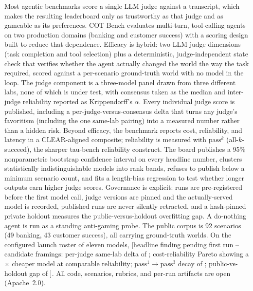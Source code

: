 Most agentic benchmarks score a single LLM judge against a transcript, which makes
the resulting leaderboard only as trustworthy as that judge and as gameable as its
preferences. COT Bench evaluates multi-turn, tool-calling agents on two production
domains (banking and customer success) with a scoring design built to reduce that
dependence. Efficacy is hybrid: two LLM-judge dimensions (task completion and tool
selection) plus a deterministic, judge-independent state check that verifies
whether the agent actually changed the world the way the task required, scored
against a per-scenario ground-truth world with no model in the loop. The judge
component is a three-model panel drawn from three different labs, none of which is
under test, with consensus taken as the median and inter-judge reliability reported
as Krippendorff's $\alpha$. Every individual judge score is published, including a
per-judge-versus-consensus delta that turns any judge's favoritism (including the
one same-lab pairing) into a measured number rather than a hidden risk. Beyond
efficacy, the benchmark reports cost, reliability, and latency in a CLEAR-aligned
composite; reliability is measured with $\text{pass}^k$ (all-$k$-succeed), the
sharper tau-bench reliability construct. The board publishes a 95\% nonparametric
bootstrap confidence interval on every headline number, clusters statistically
indistinguishable models into rank bands, refuses to publish below a minimum
scenario count, and fits a length-bias regression to test whether longer outputs
earn higher judge scores. Governance is explicit: runs are pre-registered before
the first model call, judge versions are pinned and the actually-served model is
recorded, published runs are never silently retracted, and a hash-pinned private
holdout measures the public-versus-holdout overfitting gap. A do-nothing agent is
run as a standing anti-gaming probe. The public corpus is 92 scenarios
(49 banking, 43 customer success), all carrying ground-truth worlds.
On the configured launch roster of eleven models, [headline finding pending first run --
candidate framings: per-judge same-lab delta of ; cost-reliability Pareto
showing a $\times$ cheaper model at comparable reliability;
$\text{pass}^1 \rightarrow \text{pass}^3$ decay of ; public-vs-holdout gap
of ]. All code, scenarios, rubrics, and per-run artifacts are open
(Apache~2.0).
